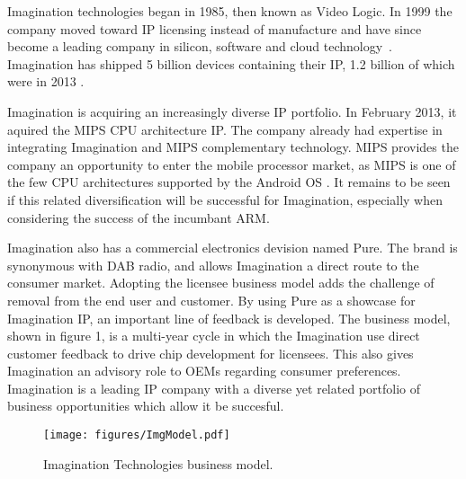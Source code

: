 {}

Imagination technologies began in 1985, then known as Video Logic.
In 1999 the company moved toward IP licensing instead of manufacture and have since become a leading company in silicon, software and cloud technology~\cite{ImgHist}. Imagination has shipped 5 billion devices containing their IP, 1.2 billion of which were in 2013 \cite{ImgAnn13}.

Imagination is acquiring an increasingly diverse IP portfolio. In February 2013, it aquired the MIPS CPU architecture IP.
The company already had expertise in integrating Imagination and MIPS complementary technology.
MIPS provides the company an opportunity to enter the mobile processor market, as MIPS is one of the few CPU architectures supported by the Android OS \cite{ImgAnn13}. 
It remains to be seen if this related diversification will be successful for Imagination, especially when considering the success of the incumbant ARM.


Imagination also has a commercial electronics devision named Pure. 
The brand is synonymous with DAB radio, and allows Imagination a direct route to the consumer market.
Adopting the licensee business model adds the challenge of removal from the end user and customer.
By using Pure as a showcase for Imagination IP, an important line of feedback is developed.
The business model, shown in figure 1, is a multi-year cycle in which the Imagination use direct customer feedback to drive chip development for licensees.
This also gives Imagination an advisory role to OEMs regarding consumer preferences.
Imagination is a leading IP company with a diverse yet related portfolio of business opportunities which allow it be succesful.
 
\begin{figure}[!htb]
   \centering
   \texttt{[image: figures/ImgModel.pdf]}
   \label{figure:ImgModel}
   \caption{Imagination Technologies business model.}
\end{figure}
